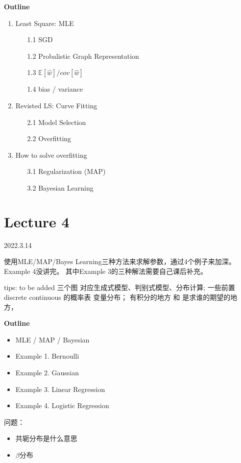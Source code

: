 \documentclass[UTF8]{ctexart}
\begin{document}
\textbf{Outline}
\begin{enumerate}
    \item Least Square: MLE 
    \begin{enumerate}
        \item[1.1] SGD
        \item[1.2] Probalistic Graph Representation
        \item[1.3] $ \mathbb{E}[\hat w] / cov[\hat w] $
        \item[1.4] bias / variance
    \end{enumerate}
    
    \item Revisted LS: Curve Fitting
    \begin{enumerate}
        \item[2.1] Model Selection
        \item[2.2] Overfitting
    \end{enumerate}
    \item How to solve overfitting
    \begin{enumerate}
        \item[3.1] Regularization (MAP)
        \item[3.2] Bayesian Learning
    \end{enumerate}
\end{enumerate}

\newpage
\section{Lecture 4}
2022.3.14

使用MLE/MAP/Bayes Learning三种方法来求解参数，通过4个例子来加深。Example 4没讲完。
其中Example 3的三种解法需要自己课后补充。

tips: to be added
三个图 对应生成式模型、判别式模型、分布计算;
一些前置 discrete continuous 的概率表 变量分布；
有积分的地方 和 是求谁的期望的地方，


\textbf{Outline}
\begin{itemize}
    \item MLE / MAP / Bayesian
    \item Example 1. Bernoulli
    \item Example 2. Gaussian
    \item Example 3. Linear Regression
    \item Example 4. Logistic Regression
\end{itemize}
问题：
\begin{itemize}
    \item 共轭分布是什么意思
    \item $\beta$分布
\end{itemize}
\end{document}
